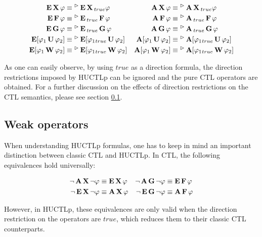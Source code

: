  \begin{align*}
 \ctlE\ctlX \varphi							& \equiv \future\ctlE\dctlX{true} \varphi &
 \ctlA\ctlX \varphi							& \equiv \future\ctlA\dctlX{true} \varphi \\ 
 \ctlE\ctlF \varphi							& \equiv \future\ctlE\dctlF{true} \varphi &
 \ctlA\ctlF \varphi							& \equiv \future\ctlA\dctlF{true} \varphi \\ 
 \ctlE\ctlG \varphi							& \equiv \future\ctlE\dctlG{true} \varphi &
 \ctlA\ctlG \varphi							& \equiv \future\ctlA\dctlG{true} \varphi \\ 
 \ctlE[\varphi_1 \ctlU \varphi_2] 	 & \equiv \future\ctlE[\varphi_1 \dctlUl{true} \varphi_2] &
 \ctlA[\varphi_1 \ctlU \varphi_2] 	 & \equiv \future\ctlA[\varphi_1 \dctlUl{true} \varphi_2] \\
 \ctlE[\varphi_1 \ctlW \varphi_2] 	 & \equiv \future\ctlE[\varphi_1 \dctlWl{true} \varphi_2] &
 \ctlA[\varphi_1 \ctlW \varphi_2] 	 & \equiv \future\ctlA[\varphi_1 \dctlWl{true} \varphi_2] \\
 \end{align*}
 
As one can easily observe, by using $true$ as a direction formula, the direction restrictions imposed by \ac{HUCTLp} can be ignored and the pure \ac{CTL} operators are obtained. For a further discussion on the effects of direction restrictions on the \ac{CTL} semantics, please see section \ref{sec:weak}.

\subsection{Weak operators}
\label{sec:weak}

When understanding \ac{HUCTLp} formulas, one has to keep in mind an important distinction between classic \ac{CTL} and \ac{HUCTLp}. In \ac{CTL}, the following equivalences hold universally:

\begin{align*}
	\neg \ctlA\ctlX \neg \varphi 			& \equiv \ctlE\ctlX \varphi &
	\neg \ctlA\ctlG \neg \varphi 			& \equiv \ctlE\ctlF \varphi \\
	\neg \ctlE\ctlX \neg \varphi 			& \equiv \ctlA\ctlX \varphi &
	\neg \ctlE\ctlG \neg \varphi 			& \equiv \ctlA\ctlF \varphi \\
\end{align*}

However, in \ac{HUCTLp}, these equivalences are only valid when the direction restriction on the operators are $true$, which reduces them to their classic \ac{CTL} counterparts.

